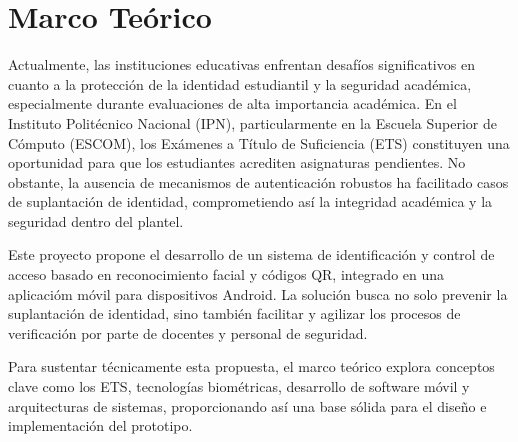 \chapter{Marco Teórico}
\label{cap:MarcoTeorico}

	Actualmente, las instituciones educativas enfrentan desafíos significativos en cuanto a la protección de la identidad estudiantil y la seguridad académica, especialmente durante evaluaciones de alta importancia académica. En el Instituto Politécnico Nacional (IPN), particularmente en la Escuela Superior de Cómputo (ESCOM), los Exámenes a Título de Suficiencia (ETS) constituyen una oportunidad para que los estudiantes acrediten asignaturas pendientes. No obstante, la ausencia de mecanismos de autenticación robustos ha facilitado casos de suplantación de identidad, comprometiendo así la integridad académica y la seguridad dentro del plantel.
	
	Este proyecto propone el desarrollo de un sistema de identificación y control de acceso basado en reconocimiento facial y códigos QR, integrado en una aplicacióm móvil para dispositivos Android. La solución busca no solo prevenir la suplantación de identidad, sino también facilitar y agilizar los procesos de verificación por parte de docentes y personal de seguridad. 
	
	Para sustentar técnicamente esta propuesta, el marco teórico explora conceptos clave como los ETS, tecnologías biométricas, desarrollo de software móvil y arquitecturas de sistemas, proporcionando así una base sólida para el diseño e implementación del prototipo.
	




%
%
%
%







